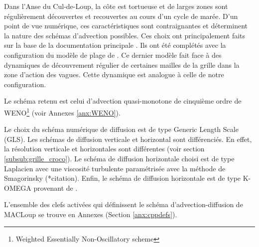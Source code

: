 \documentclass[10pt,a4paper,titlepage]{article}
\begin{document}
    Dans l'Anse du Cul-de-Loup, la côte est tortueuse et de larges zones sont régulièrement découvertes et recouvertes au cours d'un cycle de marée.
    D'un point de vue numérique, ces caractéristiques sont contraignantes et déterminent la nature des schémas d'advection possibles.
    Ces choix ont principalement faits sur la base de la documentation principale \parencite{cppkeys_description}.
    Ils ont été complétés avec la configuration du modèle de plage de  \cite{swash_article_MARCHESIELLO2021101816}.
    Ce dernier modèle fait face à des dynamiques de découvrement régulier de certaines mailles de la grille dans la zone d'action des vagues.
    Cette dynamique est analogue à celle de notre configuration.
    
    Le schéma retenu est celui d'advection quasi-monotone de cinquième ordre de WENO\footnote{Weighted Essentially Non-Oscillatory scheme} (voir Annexes \ref{anx:WENO}).
    
    Le choix du schéma numérique de diffusion est de type Generic Length Scale (GLS).
    Les schémas de diffusion verticale et horizontal sont différenciés.
    En effet, la résolution verticale et horizontales sont différentes (voir section \ref{subsub:grille_croco}).
    Le schéma de diffusion horizontale choisi est de type Laplacien avec une viscosité turbulente paramétrisée avec la méthode de Smagorinsky (*citation).
    Enfin, le schéma de diffusion horizontale est de type K-OMEGA provenant de \cite{GLS_KOMEGA_kolmogorov1941equations}.

L'ensemble des clefs activées qui définissent le schéma d'advection-diffusion de MACLoup se trouve en Annexes (Section \ref{anx:cppdefs}).
\end{document}
